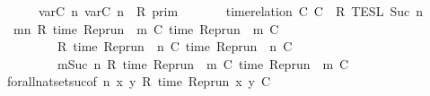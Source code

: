 \begin{isabellebody}
\isanewline
\ \ \ \ \ {\isasymlbrakk}\ {\isasymlfloor}{\isasymtau}\isactrlsub v\isactrlsub a\isactrlsub r{\isacharparenleft}C\ n{\isacharparenright}{\isacharcomma}\ {\isasymtau}\isactrlsub v\isactrlsub a\isactrlsub r{\isacharparenleft}C\ n{\isacharparenright}{\isasymrfloor}\ {\isasymin}\ R\ {\isasymrbrakk}\isactrlsub p\isactrlsub r\isactrlsub i\isactrlsub m\isanewline
\ \ \ \ \ {\isasyminter}\ {\isasymlbrakk}\ time{\isacharminus}relation\ {\isasymlfloor}C\ C\ {\isasymin}\ R\ {\isasymrbrakk}\isactrlsub T\isactrlsub E\isactrlsub S\isactrlsub L\isactrlbsup {\isasymge}\ Suc\ n\isactrlesup {\isacartoucheclose}\isanewline
%
\isadelimproof
%
\endisadelimproof
%
\isatagproof
{}\isamarkupfalse%
\ {\isacharminus}\isanewline
\ \ \isamarkupfalse%
\ {\isacartoucheopen}{\isacharbraceleft}{\isasymrho}{\isachardot}\ {\isasymforall}m{\isasymge}n{\isachardot}\ R\ {\isacharparenleft}time\ {\isacharparenleft}{\isacharparenleft}Rep{\isacharunderscore}run\ {\isasymrho}{\isacharparenright}\ m\ C\ time\ {\isacharparenleft}{\isacharparenleft}Rep{\isacharunderscore}run\ {\isasymrho}{\isacharparenright}\ m\ C\isanewline
\ \ \ \ \ \ \ {\isacharequal}\ {\isacharbraceleft}{\isasymrho}{\isachardot}\ R\ {\isacharparenleft}time\ {\isacharparenleft}{\isacharparenleft}Rep{\isacharunderscore}run\ {\isasymrho}{\isacharparenright}\ n\ C\ time\ {\isacharparenleft}{\isacharparenleft}Rep{\isacharunderscore}run\ {\isasymrho}{\isacharparenright}\ n\ C\isanewline
\ \ \ \ \ \ \ {\isasyminter}\ {\isacharbraceleft}{\isasymrho}{\isachardot}\ {\isasymforall}m{\isasymge}Suc\ n{\isachardot}\ R\ {\isacharparenleft}time\ {\isacharparenleft}{\isacharparenleft}Rep{\isacharunderscore}run\ {\isasymrho}{\isacharparenright}\ m\ C\ time\ {\isacharparenleft}{\isacharparenleft}Rep{\isacharunderscore}run\ {\isasymrho}{\isacharparenright}\ m\ C\isanewline
\ \ \ \ \isamarkupfalse%
\ forall{\isacharunderscore}nat{\isacharunderscore}set{\isacharunderscore}suc{\isacharbrackleft}of\ {\isacartoucheopen}n{\isacartoucheclose}\ {\isacartoucheopen}{\isasymlambda}x\ y{\isachardot}\ R\ {\isacharparenleft}time\ {\isacharparenleft}{\isacharparenleft}Rep{\isacharunderscore}run\ x{\isacharparenright}\ y\ C\isanewline

\end{isabellebody}
